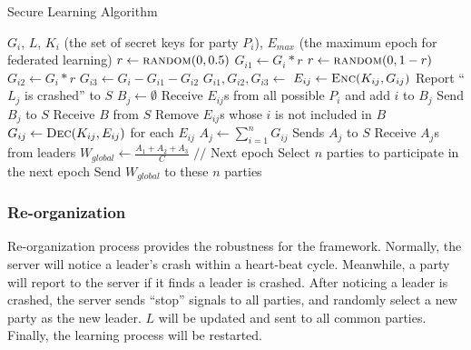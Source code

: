 \begin{algorithm}
    \label{sec-learning}
    \caption{Secure Learning Algorithm}
    \begin{algorithmic}[1] 
        \Require $G_i$, $L$, $K_i$ (the set of secret keys for party $P_i$), $E_{max}$ (the maximum epoch for federated learning)
            \State $r \gets \Call{random}{0, 0.5}$
            \State $G_{i1} \gets G_i * r$
            \State $r \gets \Call{random}{0, 1-r}$
            \State $G_{i2} \gets G_i * r$
            \State $G_{i3} \gets G_i - G_{i1} - G_{i2}$
            \State {}
        \EndFunction
        \State
            \State $G_{i1}, G_{i2}, G_{i3} \gets$ 
                \State $E_{ij} \gets \Call{Enc}{K_{ij}, G_{ij}}$
                    \State Report ``$L_j$ is crashed'' to $S$
                \EndIf
            \EndFor
        \EndFunction
        \State
            \State $B_j \gets \emptyset$
            \State Receive $E_{ij}$s from all possible $P_i$ and add $i$ to $B_j$
            \State Send $B_j$ to $S$
            \State Receive $B$ from $S$
            \State Remove $E_{ij}$s whose $i$ is not included in $B$
            \State $G_{ij} \gets \Call{Dec}{K_{ij}, E_{ij}}$ for each $E_{ij}$
            \State $A_j \gets \sum_{i=1}^nG_{ij}$
            \State Sends $A_j$ to $S$
        \EndFunction
        \State
                \State {}
            \EndIf
            \State Receive $A_j$s from leaders
            \State $W_{global} \gets \frac{A_1 + A_2 + A_3}{C} $
            \State {} 
            \State $//$ Next epoch
            \State Select $n$ parties to participate in the next epoch
            \State Send $W_{global}$ to these $n$ parties
            \State {}
        \EndFunction
    \end{algorithmic}
\end{algorithm}


\subsubsection{\textbf{Re-organization}}
Re-organization process provides the robustness for the framework. Normally, the server will notice a leader's crash within a heart-beat cycle. Meanwhile, a party will report to the server if it finds a leader is crashed. After noticing a leader is crashed, the server sends ``stop'' signals to all parties, and randomly select a new party as the new leader. $L$ will be updated and sent to all common parties. Finally, the learning process will be restarted.

